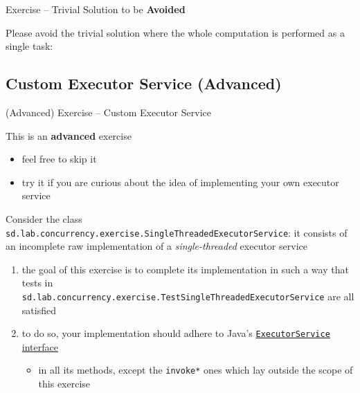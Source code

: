 \documentclass{beamer}\mode<presentation>{\usetheme{AMSBolognaFC}}
\begin{document}
\begin{frame}[c,allowframebreaks]{Exercise \currentExercise{} -- Trivial Solution to be \textbf{Avoided}}

	Please \alert{avoid} the trivial solution where the whole computation is performed as a single task:
	

\end{frame}

\startExercise

\subsection{Custom Executor Service (Advanced)}

\begin{frame}[c,allowframebreaks]{(Advanced) Exercise \currentExercise{} -- Custom Executor Service}

	\begin{alertblock}{This is an \textbf{advanced} exercise}
		\begin{itemize}
			\item feel free to skip it
			\item try it if you are curious about the idea of implementing your own executor service
		\end{itemize}
	\end{alertblock}

	\framebreak

	Consider the class \texttt{sd.lab.concurrency.exercise.\alert{SingleThreadedExecutorService}}: it consists of an \alert{incomplete} raw implementation of a \emph{single-threaded} executor service
	\bigskip
	\begin{enumerate}
		\item the goal of this exercise is to complete its implementation in such a way that tests in \texttt{sd.lab\allowbreak{}.concurrency\allowbreak{}.exercise\allowbreak{}.\alert{TestSingleThreadedExecutorService}}
		are all satisfied

		\bigskip

		\item to do so, your implementation should adhere to Java's \href{https://docs.oracle.com/javase/8/docs/api/java/util/concurrent/ExecutorService.html}{\texttt{ExecutorService} interface}
		\begin{itemize}
			\item in all its methods, except the \texttt{invoke*} ones which lay outside the scope of this exercise
		\end{itemize}


\end{enumerate}
\end{frame}
\end{document}
